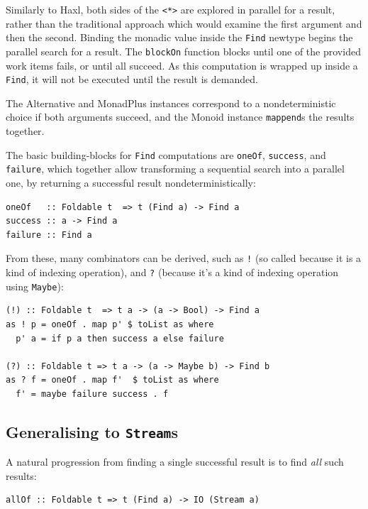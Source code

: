 Similarly to Haxl\cite{haxl}, both sides of the \verb|<*>| are
explored in parallel for a result, rather than the traditional
approach which would examine the first argument and then the
second. Binding the monadic value inside the \verb|Find| newtype
begins the parallel search for a result. The \verb|blockOn| function
blocks until one of the provided work items fails, or until all
succeed. As this computation is wrapped up inside a \verb|Find|, it
will not be executed until the result is demanded.

The Alternative and MonadPlus instances correspond to a
nondeterministic choice if both arguments succeed, and the Monoid
instance \verb|mappend|s the results together.

The basic building-blocks for \verb|Find| computations are
\verb|oneOf|, \verb|success|, and \verb|failure|, which together allow
transforming a sequential search into a parallel one, by returning a
successful result nondeterministically:

\begin{verbatim}
oneOf   :: Foldable t  => t (Find a) -> Find a
success :: a -> Find a
failure :: Find a
\end{verbatim}

From these, many combinators can be derived, such as \verb|!| (so
called because it is a kind of indexing operation), and \verb|?|
(because it's a kind of indexing operation using \verb|Maybe|):

\begin{verbatim}
(!) :: Foldable t  => t a -> (a -> Bool) -> Find a
as ! p = oneOf . map p' $ toList as where
  p' a = if p a then success a else failure

(?) :: Foldable t => t a -> (a -> Maybe b) -> Find b
as ? f = oneOf . map f'  $ toList as where
  f' = maybe failure success . f
\end{verbatim}

\subsection{Generalising to \texttt{Stream}s}
\label{sec:searchparty-api-stream}

A natural progression from finding a single successful result is to
find \textit{all} such results:

\begin{verbatim}
allOf :: Foldable t => t (Find a) -> IO (Stream a)
\end{verbatim}

